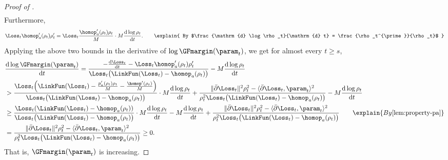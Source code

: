 \begin{proof}[Proof of ]
\begin{align*}
\end{align*}
Furthermore, 
\begin{equation*}
        \Loss_t \homop_a^\prime (\rho_t)  \rho_t^{\prime} = \Loss_t \frac{\homop_a^{\prime}(\rho_t) \rho_t}{M} \cdot M\frac{\mathrm{d} \log \rho_t}{\mathrm{d} t}. \qquad\explain{ By $\frac{\mathrm{d} \log \rho_t}{\mathrm{d} t} = \frac{\rho_t^{\prime}}{\rho_t}$ } 
\end{equation*}
Applying the above two bounds in the derivative of $\log \GFmargin(\param_t)$, we get for almost every $t\ge s$,
\begin{align*}
   &\lefteqn{ \frac{\mathrm{d} \log \GFmargin(\param_t)}{\mathrm{d} t} = \frac{-\frac{\mathrm{d} \Loss_t}{\mathrm{d} t} - \Loss_t \homop_a^\prime (\rho_t)  \rho_t^{\prime}}{\Loss_t \big(\LinkFun(\Loss_t) - \homop_a(\rho_t)\big)} - M \frac{\mathrm{d} \log \rho_t}{\mathrm{d} t} }\\
     & > \frac{\Loss_t \Big(\LinkFun(\Loss_t) - \frac{p^\prime _a(\rho_t)\rho_t}{M} - \frac{\homop^{\prime}(\rho_t)}{M} \Big)}{\Loss_t \big(\LinkFun(\Loss_t) - \homop_a(\rho_t)\big)}\cdot M \frac{\mathrm{d} \log \rho_t}{\mathrm{d} t}  + \frac{\|\bar \partial \Loss_t\|^2 \rho_t^2 - \langle \bar \partial \Loss_t, \param_t \rangle^2 }{\rho_t^2\Loss_t \big(\LinkFun(\Loss_t) - \homop_a(\rho_t)\big)} - M \frac{\mathrm{d} \log \rho_t}{\mathrm{d} t} \\ 
    & \ge \frac{\Loss_t (\LinkFun(\Loss_t) - \homop_a(\rho_t) )}{\Loss_t \big(\LinkFun(\Loss_t) - \homop_a(\rho_t)\big)}\cdot M \frac{\mathrm{d} \log \rho_t}{\mathrm{d} t} - M \frac{\mathrm{d} \log \rho_t}{\mathrm{d} t}  + \frac{\|\bar \partial \Loss_t\|^2 \rho_t^2 - \langle \bar \partial \Loss_t, \param_t \rangle^2 }{\rho_t^2\Loss_t \big(\LinkFun(\Loss_t) - \homop_a(\rho_t)\big)}  \qquad \explain{ By \Cref{lem:property-pa}} \\ 
    & = \frac{\|\bar \partial \Loss_t\|^2 \rho_t^2 - \langle \bar \partial \Loss_t, \param_t \rangle^2 }{\rho_t^2\Loss_t \big(\LinkFun(\Loss_t) - \homop_a(\rho_t)\big)} \ge 0. 
\end{align*}
That is, $\GFmargin(\param_t)$ is increasing. 


\end{proof}

